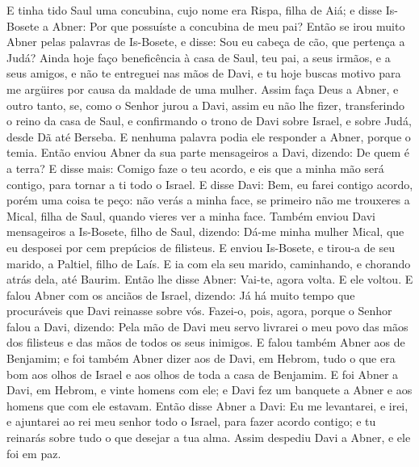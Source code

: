 E tinha tido Saul uma concubina, cujo nome era Rispa, filha de
Aiá; e disse Is-Bosete a Abner: Por que possuíste a concubina de meu
pai? Então se irou muito Abner pelas palavras de Is-Bosete, e
disse: Sou eu cabeça de cão, que pertença a Judá? Ainda hoje faço
beneficência à casa de Saul, teu pai, a seus irmãos, e a seus
amigos, e não te entreguei nas mãos de Davi, e tu hoje buscas motivo
para me argüires por causa da maldade de uma mulher. Assim faça
Deus a Abner, e outro tanto, se, como o Senhor jurou a Davi, assim
eu não lhe fizer, transferindo o reino da casa de Saul, e
confirmando o trono de Davi sobre Israel, e sobre Judá, desde Dã até
Berseba. E nenhuma palavra podia ele responder a Abner,
porque o temia. Então enviou Abner da sua parte mensageiros a
Davi, dizendo: De quem é a terra? E disse mais: Comigo faze o teu
acordo, e eis que a minha mão será contigo, para tornar a ti todo o
Israel. E disse Davi: Bem, eu farei contigo acordo, porém uma
coisa te peço: não verás a minha face, se primeiro não me trouxeres
a Mical, filha de Saul, quando vieres ver a minha face.
Também enviou Davi mensageiros a Is-Bosete, filho de Saul,
dizendo: Dá-me minha mulher Mical, que eu desposei por cem prepúcios
de filisteus. E enviou Is-Bosete, e tirou-a de seu marido, a
Paltiel, filho de Laís. E ia com ela seu marido, caminhando,
e chorando atrás dela, até Baurim. Então lhe disse Abner: Vai-te,
agora volta. E ele voltou. E falou Abner com os anciãos de
Israel, dizendo: Já há muito tempo que procuráveis que Davi reinasse
sobre vós. Fazei-o, pois, agora, porque o Senhor falou a
Davi, dizendo: Pela mão de Davi meu servo livrarei o meu povo das
mãos dos filisteus e das mãos de todos os seus inimigos. E
falou também Abner aos de Benjamim; e foi também Abner dizer aos de
Davi, em Hebrom, tudo o que era bom aos olhos de Israel e aos olhos
de toda a casa de Benjamim. E foi Abner a Davi, em Hebrom, e
vinte homens com ele; e Davi fez um banquete a Abner e aos homens
que com ele estavam. Então disse Abner a Davi: Eu me
levantarei, e irei, e ajuntarei ao rei meu senhor todo o Israel,
para fazer acordo contigo; e tu reinarás sobre tudo o que desejar a
tua alma. Assim despediu Davi a Abner, e ele foi em paz.

